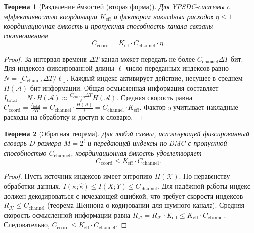\documentclass[12pt]{article}
\newtheorem{theorem}{Теорема}
\begin{document}
	\begin{theorem}[Разделение ёмкостей (вторая форма)]
		\label{thm:capacity-separation}
		Для YPSDC-системы с эффективностью координации \(K_{\mathrm{eff}}\) и фактором накладных расходов \(\eta \le 1\) координационная ёмкость и пропускная способность канала связаны соотношением
		\begin{equation}
			\boxed{C_{\mathrm{coord}} = K_{\mathrm{eff}} \cdot C_{\mathrm{channel}} \cdot \eta}.
			\label{eq:capacity-separation}
		\end{equation}
	\end{theorem}
	
	\begin{proof}
		За интервал времени \(\Delta T\) канал может передать не более \(C_{\mathrm{channel}} \Delta T\) бит. Для индексов фиксированной длины \(\ell\) число переданных индексов равно \(N = \lfloor C_{\mathrm{channel}} \Delta T / \ell \rfloor\). Каждый индекс активирует действие, несущее в среднем \(H(\mathcal{A})\) бит информации. Общая осмысленная информация составляет \(I_{\mathrm{total}} = N \cdot H(\mathcal{A}) \approx \frac{C_{\mathrm{channel}} \Delta T}{\ell} H(\mathcal{A})\). Средняя скорость равна \(C_{\mathrm{coord}} = \frac{I_{\mathrm{total}}}{\Delta T} = C_{\mathrm{channel}} \cdot \frac{H(\mathcal{A})}{\ell} = C_{\mathrm{channel}} \cdot K_{\mathrm{eff}}\). Фактор \(\eta\) учитывает накладные расходы на обработку и доступ к словарю.
	\end{proof}
	
	\begin{theorem}[Обратная теорема]
		Для любой схемы, использующей фиксированный словарь \(D\) размера \(M = 2^\ell\) и передающей индексы по DMC с пропускной способностью \(C_{\mathrm{channel}}\), координационная ёмкость удовлетворяет
		\[
		C_{\mathrm{coord}} \le K_{\mathrm{eff}} \cdot C_{\mathrm{channel}}.
		\]
	\end{theorem}
	
	\begin{proof}
		Пусть источник индексов имеет энтропию \(H(\mathcal{K})\). По неравенству обработки данных, \(I(\kappa;\hat{\kappa}) \le I(X;Y) \le C_{\mathrm{channel}}\). Для надёжной работы индекс должен декодироваться с исчезающей ошибкой, что требует скорости индексов \(R_{\mathcal{K}} \le C_{\mathrm{channel}}\) (теорема Шеннона о кодировании для шумного канала). Средняя скорость осмысленной информации равна \(R_{\mathcal{A}} = R_{\mathcal{K}} \cdot K_{\mathrm{eff}} \le K_{\mathrm{eff}} \cdot C_{\mathrm{channel}}\). Следовательно, \(C_{\mathrm{coord}} \le K_{\mathrm{eff}} \cdot C_{\mathrm{channel}}\).
	\end{proof}
	
\end{document}
